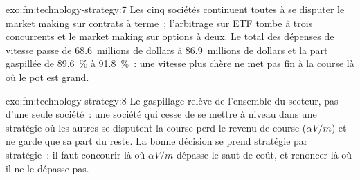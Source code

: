 \begin{solution}{exo:fm:technology-strategy:7}
Les cinq sociétés continuent toutes à se disputer le market making sur contrats à terme~; l'arbitrage sur ETF tombe à trois concurrents et le market making sur options à deux. Le total des dépenses de vitesse
passe de 68.6~millions de dollars à 86.9~millions de dollars et la part gaspillée de 89.6~\% à 91.8~\%~: une vitesse plus chère ne met pas fin à la course là où le pot est grand.
\end{solution}

\begin{solution}{exo:fm:technology-strategy:8}
Le gaspillage relève de l'ensemble du secteur, pas d'une seule société~: une société qui cesse de se mettre à niveau dans une stratégie où les autres se disputent la course perd le revenu de course ($\alpha V/m$) et
ne garde que sa part du reste. La bonne décision se prend stratégie par stratégie~: il faut concourir là où $\alpha V/m$ dépasse le saut de coût, et renoncer là où il ne le dépasse pas.
\end{solution}

